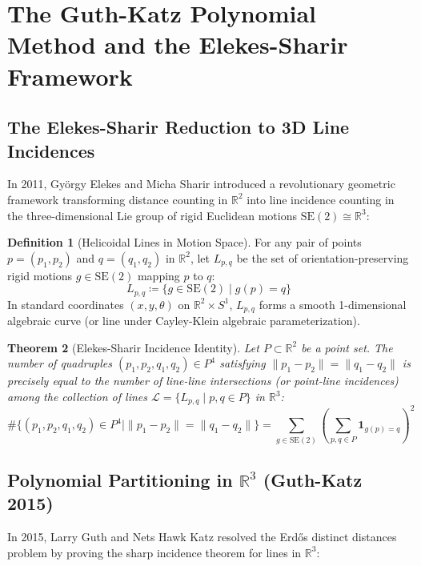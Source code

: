 \documentclass[11pt,a4paper]{article}
\newtheorem{theorem}{Theorem}[section]
\theoremstyle{definition}
\newtheorem{definition}[theorem]{Definition}
\begin{document}
\section{The Guth-Katz Polynomial Method and the Elekes-Sharir Framework}

\subsection{The Elekes-Sharir Reduction to 3D Line Incidences}
In 2011, Gy\"orgy Elekes and Micha Sharir \cite{elekes2011} introduced a revolutionary geometric framework transforming distance counting in $\mathbb{R}^2$ into line incidence counting in the three-dimensional Lie group of rigid Euclidean motions $\mathrm{SE}(2) \cong \mathbb{R}^3$:

\begin{definition}[Helicoidal Lines in Motion Space]\label{def:helicoidal_lines}
For any pair of points $p = (p_1, p_2)$ and $q = (q_1, q_2)$ in $\mathbb{R}^2$, let $L_{p, q}$ be the set of orientation-preserving rigid motions $g \in \mathrm{SE}(2)$ mapping $p$ to $q$:
\begin{equation}\label{eq:rigid_line}
L_{p, q} \coloneqq \{ g \in \mathrm{SE}(2) \mid g(p) = q \}
\end{equation}
In standard coordinates $(x, y, \theta)$ on $\mathbb{R}^2 \times S^1$, $L_{p, q}$ forms a smooth 1-dimensional algebraic curve (or line under Cayley-Klein algebraic parameterization).
\end{definition}

\begin{theorem}[Elekes-Sharir Incidence Identity]\label{thm:elekes_sharir}
Let $P \subset \mathbb{R}^2$ be a point set.
The number of quadruples $(p_1, p_2, q_1, q_2) \in P^4$ satisfying $\|p_1 - p_2\| = \|q_1 - q_2\|$ is precisely equal to the number of line-line intersections (or point-line incidences) among the collection of lines $\mathcal{L} = \{ L_{p, q} \mid p, q \in P \}$ in $\mathbb{R}^3$:
\begin{equation}\label{eq:es_identity}
\#\{ (p_1, p_2, q_1, q_2) \in P^4 \mid \|p_1 - p_2\| = \|q_1 - q_2\| \} = \sum_{g \in \mathrm{SE}(2)} \left( \sum_{p, q \in P} \mathbf{1}_{g(p) = q} \right)^2
\end{equation}
\end{theorem}

\subsection{Polynomial Partitioning in $\mathbb{R}^3$ (Guth-Katz 2015)}
In 2015, Larry Guth and Nets Hawk Katz \cite{guth2015} resolved the Erd\H{o}s distinct distances problem by proving the sharp incidence theorem for lines in $\mathbb{R}^3$:
\end{document}
